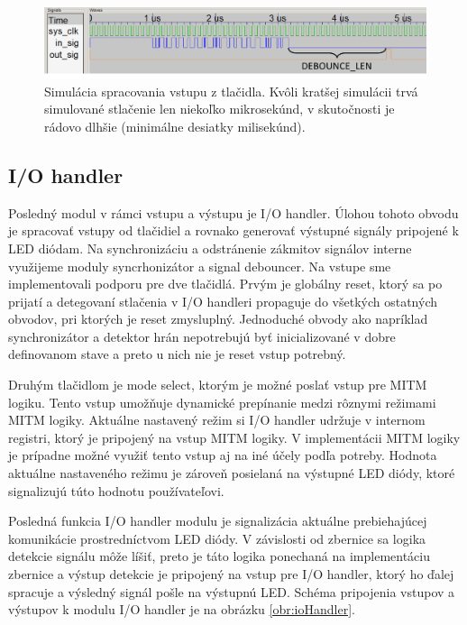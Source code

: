 \begin{figure}
    \centerline{\includegraphics[width=1\textwidth]{images/simulations/debouncerSim.png}}
    \caption[Simulácia spracovania vstupu z tlačidla]{Simulácia spracovania vstupu z tlačidla. Kvôli kratšej simulácii trvá simulované stlačenie len niekoľko mikrosekúnd, v skutočnosti je rádovo dlhšie (minimálne desiatky milisekúnd).}
    \label{obr:debouncerSim}
\end{figure}

\subsection{I/O handler}
Posledný modul v rámci vstupu a výstupu je I/O handler. Úlohou tohoto obvodu je spracovať vstupy od tlačidiel a rovnako generovať výstupné signály pripojené k LED diódam. Na synchronizáciu a odstránenie zákmitov signálov interne využijeme moduly syncrhonizátor a signal debouncer.  Na vstupe sme implementovali podporu pre dve tlačidlá. Prvým je globálny reset, ktorý sa po prijatí a detegovaní stlačenia v I/O handleri propaguje do všetkých ostatných obvodov, pri ktorých je reset zmysluplný. Jednoduché obvody ako napríklad synchronizátor a detektor hrán nepotrebujú byť inicializované v dobre definovanom stave a preto u nich nie je reset vstup potrebný.

Druhým tlačidlom je mode select, ktorým je možné poslať vstup pre MITM logiku. Tento vstup umožňuje dynamické prepínanie medzi rôznymi režimami MITM logiky. Aktuálne nastavený režim si I/O handler udržuje v internom registri, ktorý je pripojený na vstup MITM logiky. V implementácii MITM logiky je prípadne možné využiť tento vstup aj na iné účely podľa potreby. Hodnota aktuálne nastaveného režimu je zároveň posielaná na výstupné LED diódy, ktoré signalizujú túto hodnotu používateľovi.

Posledná funkcia I/O handler modulu je signalizácia aktuálne prebiehajúcej komunikácie prostredníctvom LED diódy. V závislosti od zbernice sa logika detekcie signálu môže líšiť, preto je táto logika ponechaná na implementáciu zbernice a výstup detekcie je pripojený na vstup pre I/O handler, ktorý ho ďalej spracuje a výsledný signál pošle na výstupnú LED. Schéma pripojenia vstupov a výstupov k modulu I/O handler je na obrázku \ref{obr:ioHandler}.

